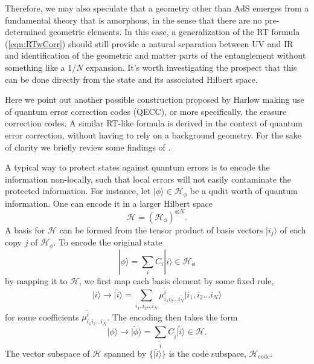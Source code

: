 \documentclass[%
preprint,
nofootinbib,
amsmath,amssymb,
aps,
prd,
showpacs,
superscriptaddress
]{revtex4-1}
\begin{document}
Therefore, we may also speculate that a geometry other than AdS emerges from a fundamental theory that is amorphous, in the sense that there are no pre-determined geometric elements. In this case, a generalization of the RT formula (\ref{eqn:RTwCorr}) should still provide a natural separation between UV and IR and identification of the geometric and matter parts of the entanglement without something like a $1/N$ expansion. 
It's worth investigating the prospect that this can be done directly from the state and its associated Hilbert space. 

Here we point out another possible construction proposed by Harlow \cite{Harlow:2016vwg} making use of quantum error correction codes (QECC), or more specifically, the erasure correction codes. A similar RT-like formula is derived in the context of quantum error correction, without having to rely on a background geometry. For the sake of clarity we briefly review some  findings of \cite{Harlow:2016vwg}.

A typical way to protect states against quantum errors is to encode the information non-locally, such that local errors will not easily contaminate the protected information. For instance, let  $|\phi\rangle\in \mathcal{H}_\phi$ be a qudit worth of quantum information. 
One can encode it in a larger Hilbert space
\begin{equation}
\mathcal{H} = (\mathcal{H}_\phi)^{\otimes N}.
\end{equation}
A basis for $\mathcal{H}$ can be formed from the tensor product of basis vectors $|i_j\rangle$ of each copy $j$ of $\mathcal{H}_\phi$. To encode the original state
\begin{equation}
|\phi\rangle = \sum_i C_i |i\rangle \in \mathcal{H}_\phi
\end{equation}
by mapping it to $\mathcal{H}$, we first map each basis element by some fixed rule,
\begin{equation}
  |i\rangle \rightarrow |\tilde i\rangle = \sum_{i_1, i_2 \dots i_N} \mu^{\tilde i}_{i_1i_2\dots i_N}|i_1, i_2 \dots i_N \rangle
\end{equation}
for some coefficients $\mu^{\tilde i}_{i_1i_2\dots i_N}$.
The encoding then takes the form
\begin{equation}
  |\phi\rangle \rightarrow  |\tilde{\phi}\rangle = \sum_{\tilde i} C_{\tilde i}|\tilde i \rangle\in\mathcal{H}.
\end{equation}
The vector subspace of $\mathcal{H}$ spanned by $\{|\tilde i\rangle\}$ is the code subspace, $\mathcal{H}_{\mathrm{code}}$.
\end{document}
